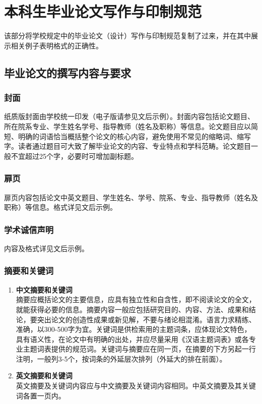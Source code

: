\chapter{本科生毕业论文写作与印制规范}

\label{cha:sysu-thesis-contents-format-requirement}


该部分将学校规定中的毕业论文（设计）写作与印制规范复制了过来，并在其中展示相关例子表明格式的正确性。


\section{毕业论文的撰写内容与要求}

\subsection{封面}


纸质版封面由学校统一印发（电子版请参见文后示例）。封面内容包括论文题目、所在院系专业、学生姓名学号、指导教师（姓名及职称）等信息。论文题目应以简短、明确的词语恰当概括整个论文的核心内容，避免使用不常见的缩略词、缩写字。读者通过题目可大致了解毕业论文的内容、专业特点和学科范畴。论文题目一般不宜超过25个字，必要时可增加副标题。

\subsection{扉页}

扉页内容包括论文中英文题目、学生姓名、学号、院系、专业、指导教师（姓名及职称）等信息。格式详见文后示例。

\subsection{学术诚信声明}

内容及格式详见文后示例。

\subsection{摘要和关键词}

\begin{enumerate}
    \item \textbf{中文摘要和关键词} \\
    摘要应概括论文的主要信息，应具有独立性和自含性，即不阅读论文的全文，就能获得必要的信息。摘要内容一般应包括研究目的、内容、方法、成果和结论，要突出论文的创造性成果或新见解，不要与绪论相混淆。语言力求精练、准确，以300-500字为宜。关键词是供检索用的主题词条，应体现论文特色，具有语义性，在论文中有明确的出处，并应尽量采用《汉语主题词表》或各专业主题词表提供的规范词。关键词与摘要应在同一页，在摘要的下方另起一行注明，一般列3-5个，按词条的外延层次排列（外延大的排在前面）。
    \item \textbf{英文摘要和关键词} \\
    英文摘要及关键词内容应与中文摘要及关键词内容相同。中英文摘要及其关键词各置一页内。
\end{enumerate}

